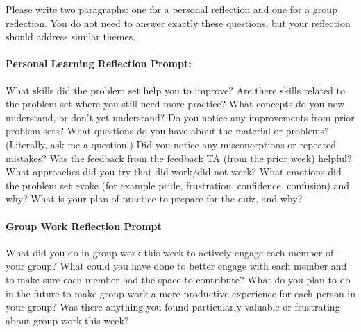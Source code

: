 \documentclass[12pt]{article}
\begin{document}

{}%




\vspace{1cm}
Please write two paragraphs: one for a personal reflection and one for a group reflection. You do not need to answer exactly these questions, but your reflection should address similar themes.

\paragraph{Personal Learning Reflection Prompt:}
What skills did the problem set help you to improve? Are there skills related to the problem set where you still need more practice? What concepts do you now understand, or don't yet understand? Do you notice any improvements from prior problem sets? What questions do you have about the material or problems? (Literally, ask me a question!) Did you notice any misconceptions or repeated mistakes? Was the feedback from the feedback TA (from the prior week) helpful? What approaches did you try that did work/did not work? What emotions did the problem set evoke (for example pride, frustration, confidence, confusion) and why? What is your plan of practice to prepare for the quiz, and why?

\paragraph{Group Work Reflection Prompt} What did you do in group work this week to actively engage each member of your group? What could you have done to better engage with each member and to make sure each member had the space to contribute? What do you plan to do in the future to make group work a more productive experience for each person in your group? Was there anything you found particularly valuable or frustrating about group work this week?
\end{document}
